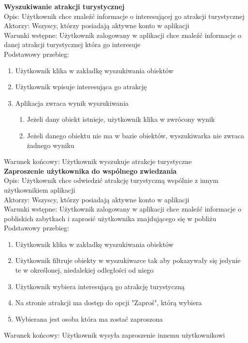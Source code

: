     \textbf{Wyszukiwanie atrakcji turystycznej} \\
        Opis: Użytkownik chce znaleźć informacje o interesującej go atrakcji turystycznej \\
        Aktorzy: Wszyscy, którzy posiadają aktywne konto w aplikacji \\ 
        Warunki wstępne: Użytkownik zalogowany w aplikacji chce znaleźć informacje o danej atrakcji turystycznej która go interesuje \\ 
        Podstawowy przebieg:
        \begin{enumerate}
            \item Użytkownik klika w zakładkę wyszukiwania obiektów
            \item Użytkownik wpisuje interesująca go atrakcję
            \item Aplikacja zwraca wynik wyszukiwania
            \begin{enumerate}
                \item Jeżeli dany obiekt istnieje, użytkownik klika w zwrócony wynik
                \item Jeżeli danego obiektu nie ma w bazie obiektów, wyszukiwarka nie zwraca żadnego wyniku
            \end{enumerate}
        \end{enumerate}
        Warunek końcowy: Użytkownik wyszukuje atrakcje turystyczne \\

    \textbf{Zaproszenie użytkownika do wspólnego zwiedzania} \\
        Opis: Użytkownik chce odwiedzić atrakcję turystyczną wspólnie z innym użytkownikiem aplikacji \\
        Aktorzy: Wszyscy, którzy posiadają aktywne konto w aplikacji \\
        Warunki wstępne: Użytkownik zalogowany w aplikacji chce znaleźć informacje o pobliskich zabytkach i zaprosić użytkownika znajdującego się w pobliżu \\
        Podstawowy przebieg:
        \begin{enumerate}
            \item Użytkownik klika w zakładkę wyszukiwania obiektów
            \item Użytkownik filtruje obiekty w wyszukiwarce tak aby pokazywały się jedynie te w określonej, niedalekiej odległości od niego
            \item Użytkownik wybiera interesującą go atrakcję turystyczną
            \item Na stronie atrakcji ma dostęp do opcji "Zaproś", którą wybiera
            \item Wybierana jest osoba która ma zostać zaproszona
        \end{enumerate}
        Warunek końcowy: Użytkownik wysyła zaproszenie innemu użytkownikowi \\

